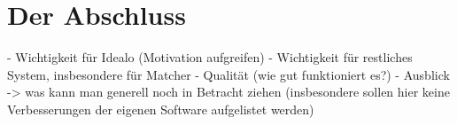 \section{Der Abschluss}

- Wichtigkeit für Idealo (Motivation aufgreifen)
- Wichtigkeit für restliches System, insbesondere für Matcher
- Qualität (wie gut funktioniert es?)
- Ausblick -> was kann man generell noch in Betracht ziehen (insbesondere sollen hier keine Verbesserungen der eigenen Software aufgelistet werden)